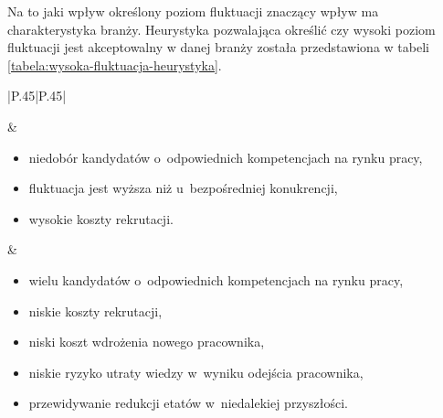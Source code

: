 Na to jaki wpływ określony poziom fluktuacji znaczący wpływ ma charakterystyka branży.
Heurystyka pozwalająca określić czy wysoki poziom fluktuacji jest akceptowalny w danej branży została przedstawiona w tabeli \ref{tabela:wysoka-fluktuacja-heurystyka}.

\noindent\begin{minipage}{\textwidth}
             \begin{table}[H]
                 \raggedright\caption{Heurystyka do oceny wysokiego poziomu fluktuacji\label{tabela:wysoka-fluktuacja-heurystyka}}
                 \begin{center}
                     \begin{tabular}{|P{.45\textwidth}|P{.45\textwidth}|}

                         \hline
                          &
                          \\
                         \hline

                         \begin{itemize}
                             \item niedobór kandydatów o~odpowiednich kompetencjach na rynku pracy,
                             \item fluktuacja jest wyższa niż u~bezpośredniej konukrencji,
                             \item wysokie koszty rekrutacji.
                         \end{itemize} &
                         \begin{itemize}
                             \item wielu kandydatów o~odpowiednich kompetencjach na rynku pracy,
                             \item niskie koszty rekrutacji,
                             \item niski koszt wdrożenia nowego pracownika,
                             \item niskie ryzyko utraty wiedzy w~wyniku odejścia pracownika,
                             \item przewidywanie redukcji etatów w~niedalekiej przyszłości.
                         \end{itemize} \\
                         \hline
                     \end{tabular}
                 \end{center}
                 \raggedright{}
                 \vspace{0.75cm}
             \end{table}
\end{minipage}


